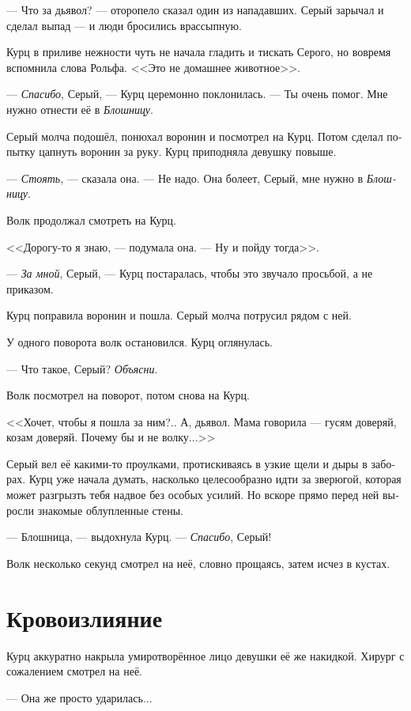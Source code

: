 \documentclass[a4paper,12pt,fleqn]{book}\usepackage{cooltooltips}\usepackage{polyglossia}\setdefaultlanguage[babelshorthands=true]{russian}\setotherlanguage{english}\defaultfontfeatures{Ligatures=TeX,Mapping=tex-text} \usepackage{xcolor}\definecolor{lightgray}{HTML}{bbbbbb}\color{lightgray}\newcommand{\ml}[3]{\textenglish{\textcolor{black}{#3}}}
\begin{document}
--- Что за дьявол? --- оторопело сказал один из нападавших.
Серый зарычал и сделал выпад --- и люди бросились врассыпную.

Курц в приливе нежности чуть не начала гладить и тискать Серого, но вовремя вспомнила слова Рольфа.
<<Это не домашнее животное>>.

--- \textit{Спасибо}, Серый, --- Курц церемонно поклонилась.
--- Ты очень помог.
Мне нужно отнести её в \textit{Блошницу}.

Серый молча подошёл, понюхал воронин и посмотрел на Курц.
Потом сделал попытку цапнуть воронин за руку.
Курц приподняла девушку повыше.

--- \textit{Стоять}, --- сказала она.
--- Не надо.
Она болеет, Серый, мне нужно в \textit{Блошницу}.

Волк продолжал смотреть на Курц.

<<Дорогу-то я знаю, --- подумала она.
--- Ну и пойду тогда>>.

--- \textit{За мной}, Серый, --- Курц постаралась, чтобы это звучало просьбой, а не приказом.

Курц поправила воронин и пошла.
Серый молча потрусил рядом с ней.

У одного поворота волк остановился.
Курц оглянулась.

--- Что такое, Серый?
\textit{Объясни}.

Волк посмотрел на поворот, потом снова на Курц.

<<Хочет, чтобы я пошла за ним?..
А, дьявол.
Мама говорила --- гусям доверяй, козам доверяй.
Почему бы и не волку...>>

Серый вел её какими-то проулками, протискиваясь в узкие щели и дыры в заборах.
Курц уже начала думать, насколько целесообразно идти за зверюгой, которая может разгрызть тебя надвое без особых усилий.
Но вскоре прямо перед ней выросли знакомые облупленные стены.

--- Блошница, --- выдохнула Курц.
--- \textit{Спасибо}, Серый!

Волк несколько секунд смотрел на неё, словно прощаясь, затем исчез в кустах.

\section{Кровоизлияние}

Курц аккуратно накрыла умиротворённое лицо девушки её же накидкой.
Хирург с сожалением смотрел на неё.

--- Она же просто ударилась...
\end{document}

